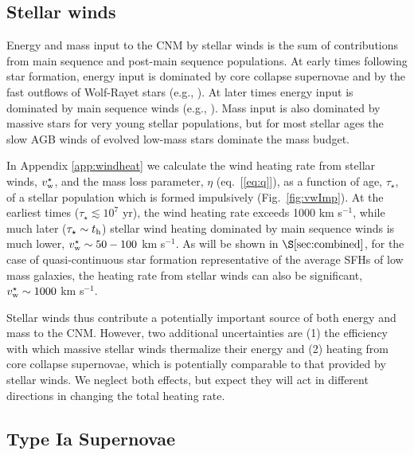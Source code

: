 \documentclass[usenatbib,fleqn]{mn2e}
\begin{document}
\subsection{Stellar winds} 

Energy and mass input to the CNM by stellar winds is the sum of contributions from main sequence and post-main sequence populations.  At early times following star formation, energy input is dominated by core collapse supernovae and by the fast outflows of Wolf-Rayet stars (e.g., \citealt{VossDiehl+:2009a}).  At later times energy input is dominated by main sequence winds (e.g., \citealt{NaimanSoares-Furtado+:2013a}).  Mass input is also dominated by massive stars for very young stellar populations, but for most stellar ages the slow AGB winds of evolved low-mass stars dominate the mass budget.  

In Appendix \ref{app:windheat} we calculate the wind heating rate from
stellar winds, $v_{\rm w}^{\star}$, and the mass loss parameter,
$\eta$ (eq.~[\ref{eq:q}]), as a function of age, $\tau_{\star}$, of a
stellar population which is formed impulsively (Fig.~\ref{fig:vwImp}).  
At the earliest times ($\tau_{\star} \lesssim 10^{7}$ yr), the wind
heating rate exceeds 1000 km s$^{-1}$, while much later ($\tau_{\star}
\sim t_{\rm h}$) stellar wind heating dominated by main sequence winds
is much lower, $v^{\star}_{\rm w} \sim 50-100 $ km s$^{-1}$.  As will be shown in $\S\ref{sec:combined}$, for the case of quasi-continuous star
formation representative of the average SFHs of low
mass galaxies, the heating rate from stellar winds can also be significant, $v_{\rm w}^{\star} \sim 1000$ km s$^{-1}$.  

Stellar winds thus contribute a potentially important source of both
energy and mass to the CNM.  However, two additional uncertainties are (1) the efficiency with which massive stellar winds thermalize their energy and (2) heating from core collapse supernovae, which is potentially comparable to that provided by stellar winds.  We neglect both effects, but expect they will act in different directions in changing the total heating rate.  

\subsection{Type Ia Supernovae} 
\end{document}
